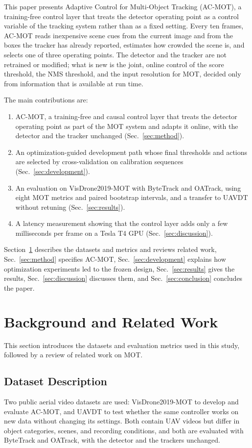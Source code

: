 \documentclass[journal]{new-aiaa}
\begin{document}
This paper presents Adaptive Control for Multi-Object Tracking (AC-MOT), a
training-free control layer that treats the detector operating point as a
control variable of the tracking system rather than as a fixed setting. Every
ten frames, AC-MOT reads inexpensive scene cues from the current image and
from the boxes the tracker has already reported, estimates how crowded the
scene is, and selects one of three operating points. The detector and the
tracker are not retrained or modified; what is new is the joint, online
control of the score threshold, the NMS threshold, and the input resolution
for MOT, decided only from information that is available at run time.

The main contributions are:
\begin{enumerate}
\item AC-MOT, a training-free and causal control layer that treats the
      detector operating point as part of the MOT system and adapts it online,
      with the detector and the tracker unchanged (Sec.~\ref{sec:method}).
\item An optimization-guided development path whose final thresholds and
      actions are selected by cross-validation on calibration sequences
      (Sec.~\ref{sec:development}).
\item An evaluation on VisDrone2019-MOT with ByteTrack and OATrack, using eight
      MOT metrics and paired bootstrap intervals, and a transfer to UAVDT
      without retuning (Sec.~\ref{sec:results}).
\item A latency measurement showing that the control layer adds only a few
      milliseconds per frame on a Tesla T4 GPU (Sec.~\ref{sec:discussion}).
\end{enumerate}

Section~\ref{sec:related} describes the datasets and metrics and reviews
related work, Sec.~\ref{sec:method} specifies AC-MOT, Sec.~\ref{sec:development}
explains how optimization experiments led to the frozen design,
Sec.~\ref{sec:results} gives the results, Sec.~\ref{sec:discussion} discusses
them, and Sec.~\ref{sec:conclusion} concludes the paper.
\section{Background and Related Work}\label{sec:related}
This section introduces the datasets and evaluation metrics used in this study, followed by a review of related work on MOT.

\subsection{Dataset Description}\label{sec:datasets}
Two public aerial video datasets are used: VisDrone2019-MOT
\cite{zhu2022visdrone} to develop and evaluate AC-MOT, and UAVDT
\cite{du2018uavdt} to test whether the same controller works on new data
without changing its settings. Both contain UAV videos but differ in object
categories, scenes, and recording conditions, and both are evaluated with
ByteTrack and OATrack, with the detector and the trackers unchanged.
\end{document}

